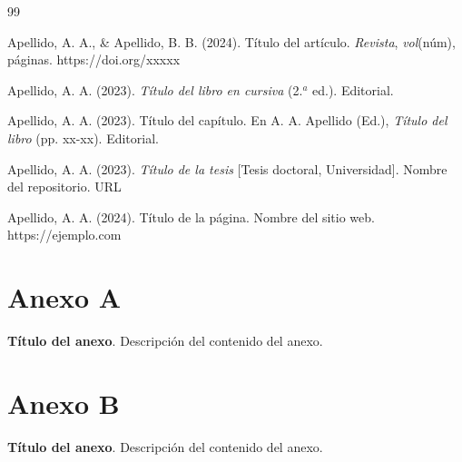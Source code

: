 \documentclass[12pt, a4paper, oneside]{article}
\begin{document}
\begin{thebibliography}{99}

\vspace{0.3em}
Apellido, A. A., \& Apellido, B. B. (2024). Título del artículo.
\textit{Revista}, \textit{vol}(núm), páginas. https://doi.org/xxxxx

\vspace{0.3em}
Apellido, A. A. (2023). \textit{Título del libro en cursiva} (2.$^a$ ed.).
Editorial.

\vspace{0.3em}
Apellido, A. A. (2023). Título del capítulo. En A. A. Apellido (Ed.),
\textit{Título del libro} (pp. xx-xx). Editorial.

\vspace{0.3em}
Apellido, A. A. (2023). \textit{Título de la tesis} [Tesis doctoral,
Universidad]. Nombre del repositorio. URL

\vspace{0.3em}
Apellido, A. A. (2024). Título de la página. Nombre del sitio web.
https://ejemplo.com

\end{thebibliography}

\newpage
\section*{Anexo A}
\textbf{Título del anexo}. Descripción del contenido del anexo.

\newpage
\section*{Anexo B}
\textbf{Título del anexo}. Descripción del contenido del anexo.
\end{document}
